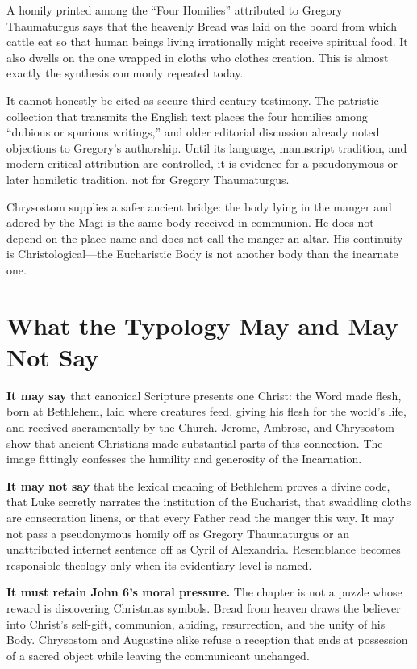 \begin{deepstudy}
A homily printed among the ``Four Homilies'' attributed to Gregory
Thaumaturgus says that the heavenly Bread was laid on the board from which
cattle eat so that human beings living irrationally might receive spiritual
food. It also dwells on the one wrapped in cloths who clothes creation.
This is almost exactly the synthesis commonly repeated today.

It cannot honestly be cited as secure third-century testimony. The patristic
collection that transmits the English text places the four homilies among
``dubious or spurious writings,'' and older editorial discussion already noted
objections to Gregory's authorship. Until its language, manuscript tradition,
and modern critical attribution are controlled, it is evidence for a
pseudonymous or later homiletic tradition, not for Gregory Thaumaturgus.

Chrysostom supplies a safer ancient bridge: the body lying in the manger and
adored by the Magi is the same body received in communion. He does not depend
on the place-name and does not call the manger an altar. His continuity is
Christological---the Eucharistic Body is not another body than the incarnate
one.

\section{What the Typology May and May Not Say}

\textbf{It may say} that canonical Scripture presents one Christ: the Word
made flesh, born at Bethlehem, laid where creatures feed, giving his flesh for
the world's life, and received sacramentally by the Church. Jerome, Ambrose,
and Chrysostom show that ancient Christians made substantial parts of this
connection. The image fittingly confesses the humility and generosity of the
Incarnation.

\textbf{It may not say} that the lexical meaning of Bethlehem proves a divine
code, that Luke secretly narrates the institution of the Eucharist, that
swaddling cloths are consecration linens, or that every Father read the manger
this way. It may not pass a pseudonymous homily off as Gregory Thaumaturgus or
an unattributed internet sentence off as Cyril of Alexandria. Resemblance
becomes responsible theology only when its evidentiary level is named.

\textbf{It must retain John 6's moral pressure.} The chapter is not a puzzle
whose reward is discovering Christmas symbols. Bread from heaven draws the
believer into Christ's self-gift, communion, abiding, resurrection, and the
unity of his Body. Chrysostom and Augustine alike refuse a reception that ends
at possession of a sacred object while leaving the communicant unchanged.


\end{deepstudy}
